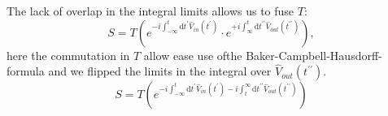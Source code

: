 \documentclass[12pt, titlepage]{article}
\begin{document}
The lack of overlap in the integral limits allows us to fuse $ T $:
\begin{equation}
S=T\left( e^{-i\int_{-\infty}^{t}\mathrm{d}t^{\prime} \hat{V}_{in}(t^{\prime})}
	\cdot
	 e^{+i\int_{\infty}^{t}\mathrm{d}t^{\prime \prime} \hat{V}_{out}(t^{\prime \prime})} \right),
\end{equation}
here the commutation in $ T $ allow ease use ofthe Baker-Campbell-Hausdorff-formula and we flipped the limits in the integral over $ \hat{V}_{out}(t^{\prime \prime})$.
\begin{equation}
S
=T
\left( 
e^{-i\int_{-\infty}^{t}\mathrm{d}t^{\prime} \hat{V}_{in}(t^{\prime})
-i\int_{t}^{\infty}\mathrm{d}t^{\prime \prime} \hat{V}_{out}(t^{\prime \prime})
}
\right)
\end{equation}
\\

%	 
\end{document}
